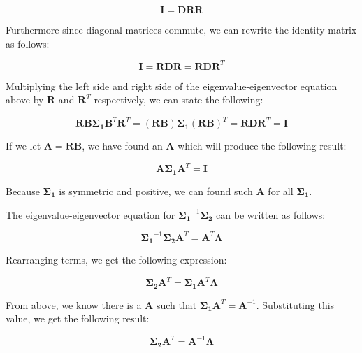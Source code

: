 \documentclass[fleqn]{article}
\begin{document}
\begin{enumerate}
		\begin{equation*}
			\mathbf{I} = \mathbf{DRR}
		\end{equation*}
		
		Furthermore since diagonal matrices commute, we can rewrite the identity matrix as follows:
		
		\begin{equation*}
			\mathbf{I} = \mathbf{RDR} = \mathbf{R}\mathbf{D}\mathbf{R}^T
		\end{equation*}
		
		Multiplying the left side and right side of the eigenvalue-eigenvector equation above by $\mathbf{R}$ and $\mathbf{R}^T$ respectively, we can state the following:
		
		\begin{equation*}
			\mathbf{R}\mathbf{B}\mathbf{\Sigma_1}\mathbf{B}^T\mathbf{R}^T = (\mathbf{RB})\mathbf{\Sigma_1}(\mathbf{RB})^T = \mathbf{R}\mathbf{D}\mathbf{R}^T = \mathbf{I}
		\end{equation*}
		
		If we let $\mathbf{A} = \mathbf{RB}$, we have found an $\mathbf{A}$ which will produce the following result:
		
		\begin{equation*}
			\mathbf{A}\mathbf{\Sigma_1}\mathbf{A}^T = \mathbf{I}
		\end{equation*}
		
		Because $\mathbf{\Sigma_1}$ is symmetric and positive, we can found such $\mathbf{A}$ for all $\mathbf{\Sigma_1}$.
		
		The eigenvalue-eigenvector equation for $\mathbf{\Sigma_1}^{-1}\mathbf{\Sigma_2}$ can be written as follows:
		
		\begin{equation*}
			\mathbf{\Sigma_1}^{-1}\mathbf{\Sigma_2}\mathbf{A}^T = \mathbf{A}^T\mathbf{\Lambda}
		\end{equation*}
		
		Rearranging terms, we get the following expression:
		
		\begin{equation*}
			\mathbf{\Sigma_2}\mathbf{A}^T = \mathbf{\Sigma_1}\mathbf{A}^T\mathbf{\Lambda}
		\end{equation*}
		
		From above, we know there is a $\mathbf{A}$ such that $\mathbf{\Sigma_1}\mathbf{A}^T = \mathbf{A}^{-1}$. Substituting this value, we get the following result:
		 
		\begin{equation*}
			\mathbf{\Sigma_2}\mathbf{A}^T = \mathbf{A}^{-1}\mathbf{\Lambda}
		\end{equation*}
		

\end{enumerate}
\end{document}
